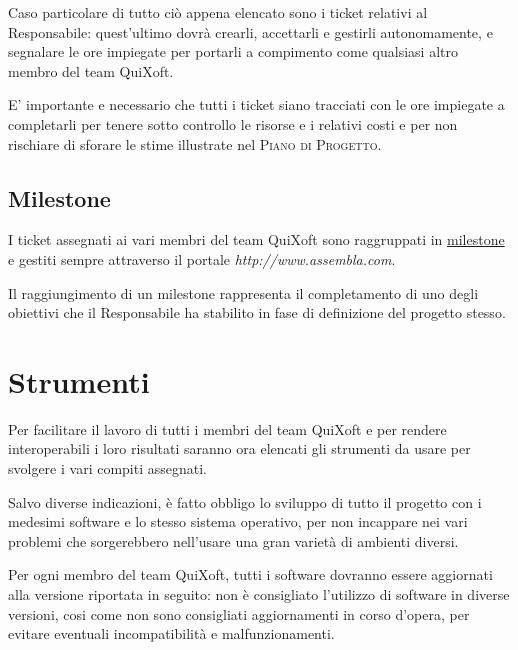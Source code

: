 \documentclass[11pt,a4paper]{article}
\begin{document}
Caso particolare di tutto ciò appena elencato sono i ticket relativi al Responsabile: quest'ultimo dovrà crearli, accettarli e gestirli autonomamente, e segnalare le ore impiegate per portarli a compimento come qualsiasi altro membro del team QuiXoft.

E' importante e necessario che tutti i ticket siano tracciati con le ore impiegate a completarli per tenere sotto controllo le risorse e i relativi costi e per non rischiare di sforare le stime illustrate nel \textsc{Piano di Progetto}.
\subsection{Milestone}
I ticket assegnati ai vari membri del team QuiXoft sono raggruppati in \underline{milestone} e gestiti sempre attraverso il portale \textit{http://www.assembla.com}.

Il raggiungimento di un milestone rappresenta il completamento di uno degli obiettivi che il Responsabile ha stabilito in fase di definizione del progetto stesso.
\section{Strumenti}
Per facilitare il lavoro di tutti i membri del team QuiXoft e per rendere interoperabili i loro risultati saranno ora elencati gli strumenti da usare per svolgere i vari compiti assegnati.

Salvo diverse indicazioni, è fatto obbligo lo sviluppo di tutto il progetto con i medesimi software e lo stesso sistema operativo, per non incappare nei vari problemi che sorgerebbero nell'usare una gran varietà di ambienti diversi.

Per ogni membro del team QuiXoft, tutti i software dovranno essere aggiornati alla versione riportata in seguito: non è consigliato l'utilizzo di software in diverse versioni, cosi come non sono consigliati aggiornamenti in corso d'opera, per evitare eventuali incompatibilità e malfunzionamenti.
\end{document}
